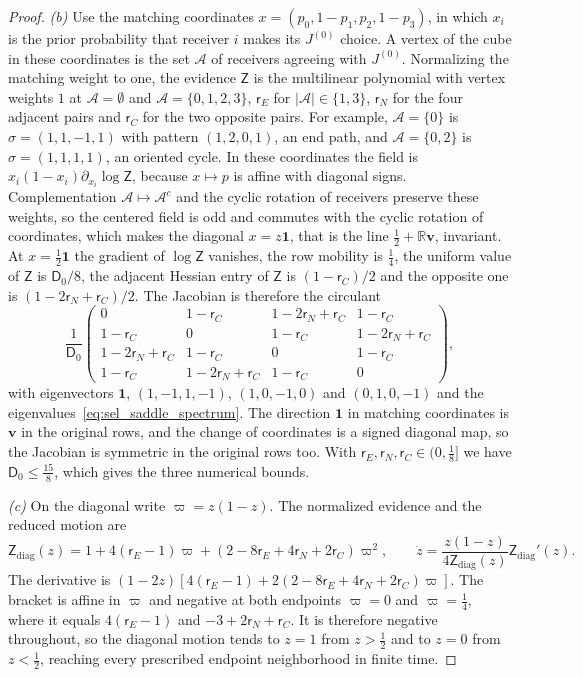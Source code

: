 \begin{proof}
\emph{(b)} Use the matching coordinates $x=(p_0,1-p_1,p_2,1-p_3)$, in which $x_i$ is the prior probability that receiver $i$ makes its $J^{(0)}$ choice. A vertex of the cube in these coordinates is the set $\mathcal A$ of receivers agreeing with $J^{(0)}$. Normalizing the matching weight to one, the evidence $\mathsf Z$ is the multilinear polynomial with vertex weights $1$ at $\mathcal A=\emptyset$ and $\mathcal A=\{0,1,2,3\}$, $\mathsf r_E$ for $|\mathcal A|\in\{1,3\}$, $\mathsf r_N$ for the four adjacent pairs and $\mathsf r_C$ for the two opposite pairs. For example, $\mathcal A=\{0\}$ is $\sigma=(1,1,-1,1)$ with pattern $(1,2,0,1)$, an end path, and $\mathcal A=\{0,2\}$ is $\sigma=(1,1,1,1)$, an oriented cycle. In these coordinates the field is $x_i(1-x_i)\partial_{x_i}\log\mathsf Z$, because $x\mapsto p$ is affine with diagonal signs. Complementation $\mathcal A\mapsto\mathcal A^c$ and the cyclic rotation of receivers preserve these weights, so the centered field is odd and commutes with the cyclic rotation of coordinates, which makes the diagonal $x=z\mathbf1$, that is the line $\frac12+\mathbb R\mathbf v$, invariant. At $x=\frac12\mathbf1$ the gradient of $\log\mathsf Z$ vanishes, the row mobility is $\frac14$, the uniform value of $\mathsf Z$ is $\mathsf D_0/8$, the adjacent Hessian entry of $\mathsf Z$ is $(1-\mathsf r_C)/2$ and the opposite one is $(1-2\mathsf r_N+\mathsf r_C)/2$. The Jacobian is therefore the circulant
\[
\frac1{\mathsf D_0}
\begin{pmatrix}
0&1-\mathsf r_C&1-2\mathsf r_N+\mathsf r_C&1-\mathsf r_C\\
1-\mathsf r_C&0&1-\mathsf r_C&1-2\mathsf r_N+\mathsf r_C\\
1-2\mathsf r_N+\mathsf r_C&1-\mathsf r_C&0&1-\mathsf r_C\\
1-\mathsf r_C&1-2\mathsf r_N+\mathsf r_C&1-\mathsf r_C&0
\end{pmatrix},
\]
with eigenvectors $\mathbf1$, $(1,-1,1,-1)$, $(1,0,-1,0)$ and $(0,1,0,-1)$ and the eigenvalues~\eqref{eq:sel_saddle_spectrum}. The direction $\mathbf1$ in matching coordinates is $\mathbf v$ in the original rows, and the change of coordinates is a signed diagonal map, so the Jacobian is symmetric in the original rows too. With $\mathsf r_E,\mathsf r_N,\mathsf r_C\in(0,\frac18]$ we have $\mathsf D_0\le\frac{15}8$, which gives the three numerical bounds.

\emph{(c)} On the diagonal write $\varpi=z(1-z)$. The normalized evidence and the reduced motion are
\[
\mathsf Z_{\mathrm{diag}}(z)=1+4(\mathsf r_E-1)\varpi+(2-8\mathsf r_E+4\mathsf r_N+2\mathsf r_C)\varpi^2,\qquad
\dot z=\frac{z(1-z)}{4\mathsf Z_{\mathrm{diag}}(z)}\mathsf Z_{\mathrm{diag}}'(z).
\]
The derivative is $(1-2z)[4(\mathsf r_E-1)+2(2-8\mathsf r_E+4\mathsf r_N+2\mathsf r_C)\varpi]$. The bracket is affine in $\varpi$ and negative at both endpoints $\varpi=0$ and $\varpi=\frac14$, where it equals $4(\mathsf r_E-1)$ and $-3+2\mathsf r_N+\mathsf r_C$. It is therefore negative throughout, so the diagonal motion tends to $z=1$ from $z>\frac12$ and to $z=0$ from $z<\frac12$, reaching every prescribed endpoint neighborhood in finite time.


\end{proof}
